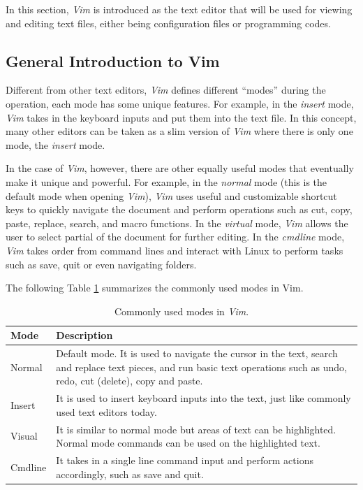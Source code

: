 In this section, \textit{Vim} is introduced as the text editor that will be used for viewing and editing text files, either being configuration files or programming codes.

\subsection{General Introduction to Vim} \label{ch4subsec:vimgeneralintro}

Different from other text editors, \textit{Vim} defines different ``modes'' during the operation, each mode has some unique features. For example, in the \textit{insert} mode, \textit{Vim} takes in the keyboard inputs and put them into the text file. In this concept, many other editors can be taken as a slim version of \textit{Vim} where there is only one mode, the \textit{insert} mode.

In the case of \textit{Vim}, however, there are other equally useful modes that eventually make it unique and powerful. For example, in the \textit{normal} mode (this is the default mode when opening \textit{Vim}), \textit{Vim} uses useful and customizable shortcut keys to quickly navigate the document and perform operations such as cut, copy, paste, replace, search, and macro functions. In the \textit{virtual} mode, \textit{Vim} allows the user to select partial of the document for further editing. In the \textit{cmdline} mode, \textit{Vim} takes order from command lines and interact with Linux to perform tasks such as save, quit or even navigating folders.

The following Table \ref{ch4tab:vimmodes} summarizes the commonly used modes in Vim.
\begin{table}
  \centering \caption{Commonly used modes in \textit{Vim}.}\label{ch4tab:vimmodes}
  \begin{tabularx}{\textwidth}{lX}
    \hline
    Mode & Description \\ \hline
    Normal & Default mode. It is used to navigate the cursor in the text, search and replace text pieces, and run basic text operations such as undo, redo, cut (delete), copy and paste. \\ \hdashline
    Insert & It is used to insert keyboard inputs into the text, just like commonly used text editors today. \\ \hdashline
    Visual & It is similar to normal mode but areas of text can be highlighted. Normal mode commands can be used on the highlighted text. \\ \hdashline
    Cmdline & It takes in a single line command input and perform actions accordingly, such as save and quit. \\
    \hline
  \end{tabularx}
\end{table}


